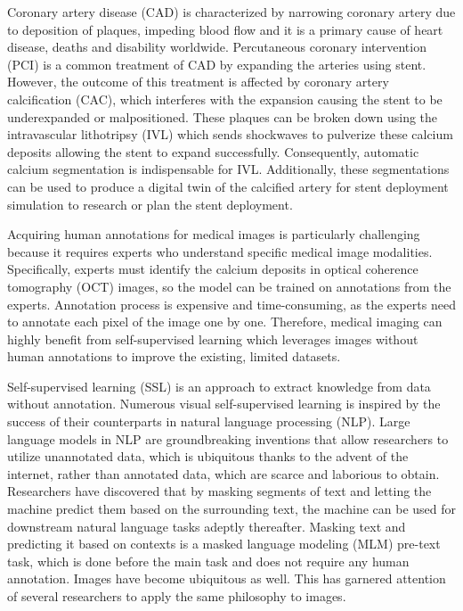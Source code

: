 \documentclass[a4paper,11pt,oneside]{report}
\begin{document}
Coronary artery disease (CAD) is characterized by narrowing coronary artery due to deposition of plaques, impeding blood flow and it is a primary cause of heart disease, deaths and disability worldwide. Percutaneous coronary intervention (PCI) is a common treatment of CAD by expanding the arteries using stent. However, the outcome of this treatment is affected by coronary artery calcification (CAC), which interferes with the expansion causing the stent to be underexpanded or malpositioned. These plaques can be broken down using the intravascular lithotripsy (IVL) which sends shockwaves to pulverize these calcium deposits allowing the stent to expand successfully. Consequently, automatic calcium segmentation is indispensable for IVL. Additionally, these segmentations can be used to produce a digital twin of the calcified artery for stent deployment simulation to research or plan the stent deployment.


Acquiring human annotations for medical images is particularly challenging because it requires experts who understand specific medical image modalities. Specifically, experts must identify the calcium deposits in optical coherence tomography (OCT) images, so the model can be trained on annotations from the experts. Annotation process is expensive and time-consuming, as the experts need to annotate each pixel of the image one by one. Therefore, medical imaging can highly benefit from self-supervised learning which leverages images without human annotations to improve the existing, limited datasets.

Self-supervised learning (SSL) is an approach to extract knowledge from data without annotation. Numerous visual self-supervised learning is inspired by the success of their counterparts in natural language processing (NLP). Large language models in NLP are groundbreaking inventions that allow researchers to utilize unannotated data, which is ubiquitous thanks to the advent of the internet, rather than annotated data, which are scarce and laborious to obtain. Researchers have discovered that by masking segments of text and letting the machine predict them based on the surrounding text, the machine can be used for downstream natural language tasks adeptly thereafter. Masking text and predicting it based on contexts is a masked language modeling (MLM) pre-text task, which is done before the main task and does not require any human annotation. Images have become ubiquitous as well. This has garnered attention of several researchers to apply the same philosophy to images.
\end{document}
